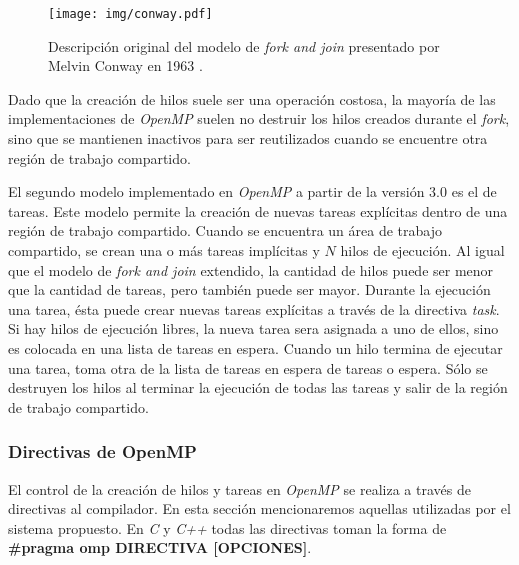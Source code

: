 \begin{figure}[!htb]

	\centering

	\texttt{[image: img/conway.pdf]}

	\caption{Descripción original del modelo de \emph{fork and join}
	presentado por Melvin Conway en 1963 \cite{conway1963}.}

	\label{conway}

\end{figure}

Dado que la creación de hilos suele ser una operación costosa, la mayoría de las
implementaciones de \emph{OpenMP} suelen no destruir los hilos creados durante
el \emph{fork}, sino que se mantienen inactivos para ser reutilizados cuando se
encuentre otra región de trabajo compartido.

El segundo modelo implementado en \emph{OpenMP} a partir de la versión 3.0 es el
de tareas. Este modelo permite la creación de nuevas tareas explícitas dentro de
una región de trabajo compartido. Cuando se encuentra un área de trabajo
compartido, se crean una o más tareas implícitas y $N$ hilos de ejecución. Al
igual que el modelo de \emph{fork and join} extendido, la cantidad de hilos
puede ser menor que la cantidad de tareas, pero también puede ser mayor. Durante
la ejecución una tarea, ésta puede crear nuevas tareas explícitas a través de la
directiva \emph{task}. Si hay hilos de ejecución libres, la nueva tarea sera
asignada a uno de ellos, sino es colocada en una lista de tareas en espera.
Cuando un hilo termina de ejecutar una tarea, toma otra de la lista de tareas en
espera de tareas o espera. Sólo se destruyen los hilos al terminar la ejecución
de todas las tareas y salir de la región de trabajo compartido.

\subsubsection{Directivas de OpenMP}

El control de la creación de hilos y tareas en \emph{OpenMP} se realiza a través
de directivas al compilador. En esta sección mencionaremos aquellas utilizadas
por el sistema propuesto. En \emph{C} y \emph{C++} todas las directivas toman la
forma de \textbf{\#pragma omp DIRECTIVA [OPCIONES]}.

